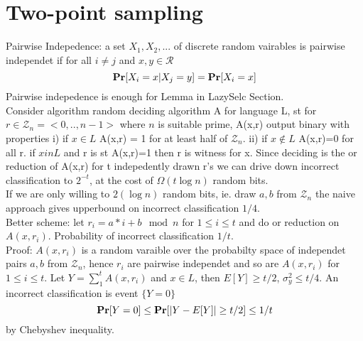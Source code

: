 \documentclass[a4paper]{article}
\def\Pr{\mbox{\textbf{Pr}}}
\begin{document}
\section{Two-point sampling}
Pairwise Indepedence: a set \(X_1,X_2,...\) of discrete random vairables is pairwise independet if for all \(i\ne j\) and \(x,y \in \mathcal{R}\)
\[\Pr[X_i = x| X_j = y] = \Pr[X_i = x]\]
Pairwise indepedence is enough for Lemma in LazySelc Section.\\
Consider algorithm random deciding algorithm A for language L, st for \(r \in \mathcal{Z}_n = <0,..,n-1>\) where \(n\) is suitable prime, A(x,r) output binary with properties i) if \(x \in L\) A(x,r) = 1 for at least half of \(\mathcal{Z}_n\). ii) if \(x\not\in L\) A(x,r)=0 for all r.
if \(x in L\) and r is st A(x,r)=1 then r is witness for x. Since deciding is the or reduction of A(x,r) for t indepedently drawn r's we can drive down incorrect classification to \(2^{-t}\), at the cost of \(\Omega(t\log n)\) random bits. \\
If we are only willing to \(2(\log n)\) random bits, ie. draw \(a,b\) from \(\mathcal{Z}_n\) the naive approach gives upperbound on incorrect classification \(1/4\).\\
Better scheme: let \(r_i = a*i + b \mod n\) for \(1 \leq i \leq t\) and do or reduction on \(A(x,r_i)\). Probability of incorrect classification \(1/t\).\\
Proof: \(A(x,r_i)\) is a random varaible over the probabilty space of independet pairs \(a,b\) from \(\mathcal{Z}_n\), hence \(r_i\) are pairwise independet and so are \(A(x,r_i)\) for \(1\leq i\leq t\). Let \(Y=\sum_1^t A(x,r_i)\) and \(x \in L\), then \(E[Y] \geq t/2\), \(\sigma_y^2 \leq t/4\). An incorrect classification is event \(\{Y=0\}\) 
\[\Pr[Y=0]\leq \Pr[|Y-E[Y]| \geq t/2] \leq 1/t\]
by Chebyshev inequality.
\end{document}
